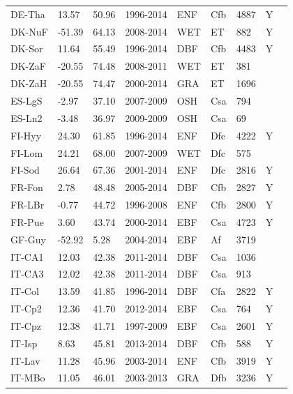 \documentclass{myreport}
\begin{document}
\begin{longtable}{lllllllll}
  DE-Tha & 13.57 & 50.96 & 1996-2014 & ENF & Cfb & 4887 & Y & \citet{DE-Tha} \\ 
  DK-NuF & -51.39 & 64.13 & 2008-2014 & WET & ET & 882 & Y & \citet{DK-NuF} \\ 
  DK-Sor & 11.64 & 55.49 & 1996-2014 & DBF & Cfb & 4483 & Y & \citet{DK-Sor} \\ 
  DK-ZaF & -20.55 & 74.48 & 2008-2011 & WET & ET & 381 &  & \citet{DK-ZaF} \\ 
  DK-ZaH & -20.55 & 74.47 & 2000-2014 & GRA & ET & 1696 &  & \citet{DK-ZaH} \\ 
  ES-LgS & -2.97 & 37.10 & 2007-2009 & OSH & Csa & 794 &  & \citet{ES-LgS} \\ 
  ES-Ln2 & -3.48 & 36.97 & 2009-2009 & OSH & Csa &  69 &  & \citet{ES-Ln2} \\ 
  FI-Hyy & 24.30 & 61.85 & 1996-2014 & ENF & Dfc & 4222 & Y & \citet{FI-Hyy} \\ 
  FI-Lom & 24.21 & 68.00 & 2007-2009 & WET & Dfc & 575 &  & \citet{FI-Lom} \\ 
  FI-Sod & 26.64 & 67.36 & 2001-2014 & ENF & Dfc & 2816 & Y & \citet{FI-Sod} \\ 
  FR-Fon & 2.78 & 48.48 & 2005-2014 & DBF & Cfb & 2827 & Y & \citet{FR-Fon} \\ 
  FR-LBr & -0.77 & 44.72 & 1996-2008 & ENF & Cfb & 2800 & Y & \citet{FR-LBr} \\ 
  FR-Pue & 3.60 & 43.74 & 2000-2014 & EBF & Csa & 4723 & Y & \citet{FR-Pue} \\ 
  GF-Guy & -52.92 & 5.28 & 2004-2014 & EBF & Af & 3719 &  & \citet{GF-Guy} \\ 
  IT-CA1 & 12.03 & 42.38 & 2011-2014 & DBF & Csa & 1036 &  & \citet{IT-CA1} \\ 
  IT-CA3 & 12.02 & 42.38 & 2011-2014 & DBF & Csa & 913 &  & \citet{IT-CA3} \\ 
  IT-Col & 13.59 & 41.85 & 1996-2014 & DBF & Cfa & 2822 & Y & \citet{IT-Col} \\ 
  IT-Cp2 & 12.36 & 41.70 & 2012-2014 & EBF & Csa & 764 & Y & \citet{IT-Cp2} \\ 
  IT-Cpz & 12.38 & 41.71 & 1997-2009 & EBF & Csa & 2601 & Y & \citet{IT-Cpz} \\ 
  IT-Isp & 8.63 & 45.81 & 2013-2014 & DBF & Cfb & 588 & Y & \citet{IT-Isp} \\ 
  IT-Lav & 11.28 & 45.96 & 2003-2014 & ENF & Cfb & 3919 & Y & \citet{IT-Lav} \\ 
  IT-MBo & 11.05 & 46.01 & 2003-2013 & GRA & Dfb & 3236 & Y & \citet{IT-MBo} \\ 

\end{longtable}
\end{document}
